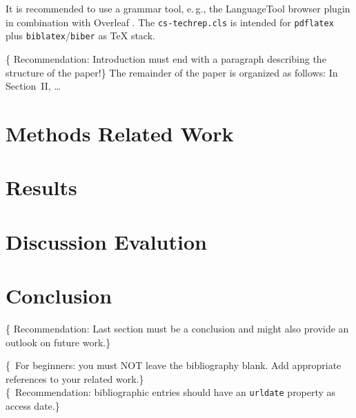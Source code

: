\documentclass[conference,a4paper,flushend]{cs-techrep} %
\begin{document}
It is recommended to use a grammar tool, e.\,g., the LanguageTool \cite{languagetool} browser plugin in combination with Overleaf \cite{overleaf}.
%
The \texttt{cs-techrep.cls} is intended for \faWarning{} \texttt{pdflatex} plus \texttt{biblatex}\;/\;\texttt{biber} as TeX stack.

\lipsum[22]

\{\faWarning{} Recommendation: Introduction must end with a paragraph describing the structure of the paper!\}
The remainder of the paper is organized as follows: In Section~II, …

\section{Methods \textbar{} Related Work}
\lipsum[23]

\section{Results}
\lipsum[24]

\section{Discussion \textbar{} Evalution}
\lipsum[25]

\section{Conclusion}
\{\faWarning{} Recommendation: Last section must be a conclusion and might also provide an outlook on future work.\}
\lipsum[26]

\{\,\faWarning{} For beginners: you must NOT leave the bibliography blank. Add appropriate references to your related work.\}\\
\{\,\faWarning{} Recommendation: bibliographic  entries should have an \texttt{urldate} property as access date.\}
\printbibliography[notcategory=selfref]
\end{document}
